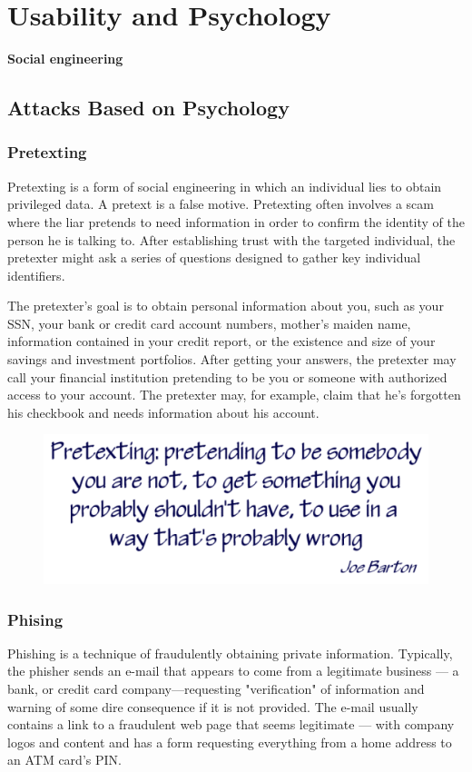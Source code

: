 \chapter{Usability and Psychology}

{\bf Social engineering}

\clearpage
\section{Attacks Based on Psychology}

	\subsection{Pretexting}
	Pretexting is a form of social engineering in which an individual lies to obtain privileged data. 
	A pretext is a false motive. Pretexting often involves a scam where the liar pretends to need 
	information in order to confirm the identity of the person he is talking to. After establishing 
	trust with the targeted individual, the pretexter might ask a series of questions designed to 
	gather key individual identifiers.

	The pretexter's goal is to obtain personal information about you, such as your SSN, your bank or 
	credit card account numbers, mother's maiden name, information contained in your credit report, 
	or the existence and size of your savings and investment portfolios.
	After getting your answers, the pretexter may call your financial institution pretending to 
	be you or someone with authorized access to your account. The pretexter may, for example, 
	claim that he's forgotten his checkbook and needs information about his account.

	\begin{figure}[H]
		\includegraphics[width=\textwidth]{pics/pretexting.png}
	\end{figure}

	\clearpage
	\subsection{Phising}
	Phishing is a technique of fraudulently obtaining private information. Typically, the phisher sends 
	an e-mail that appears to come from a legitimate business — a bank, or credit card company—requesting
	"verification" of information and warning of some dire consequence if it is not provided. The e-mail 
	usually contains a link to a fraudulent web page that seems legitimate — with company logos and content
	and has a form requesting everything from a home address to an ATM card's PIN.


